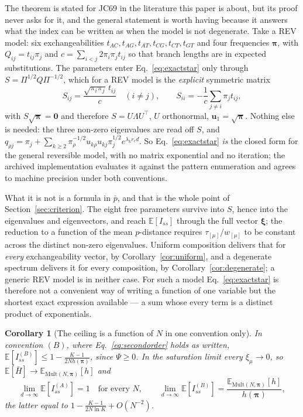 \documentclass[11pt]{article}
\newcommand{\Iss}{I_{ss}}
\newcommand{\Hbar}{\bar H}
\newcommand{\bpi}{\boldsymbol{\pi}}
\newcommand{\bxi}{\boldsymbol{\xi}}
\newcommand{\E}{\mathbb{E}}
\newcommand{\Mult}{\mathrm{Mult}}
\newtheorem{corollary}[theorem]{Corollary}
\theoremstyle{definition}
\theoremstyle{remark}
\begin{document}
The theorem is stated for JC69 in the literature this paper is about, but its
proof never asks for it, and the general statement is worth having because it
answers what the index can be written as when the model is not degenerate.
Take a REV model: six exchangeabilities $t_{AC},t_{AG},t_{AT},t_{CG},t_{CT},
t_{GT}$ and four frequencies $\bpi$, with $Q_{ij}=t_{ij}\pi_j$ and
$c=\sum_{i<j}2\pi_i\pi_jt_{ij}$ so that branch lengths are in expected
substitutions. The parameters enter Eq.~\eqref{eq:exactstar} only through
$S=\Pi^{1/2}Q\Pi^{-1/2}$, which for a REV model is the \emph{explicit}
symmetric matrix
\begin{equation}
  S_{ij}=\frac{\sqrt{\pi_i\pi_j}\,t_{ij}}{c}\quad (i\ne j),\qquad
  S_{ii}=-\frac{1}{c}\sum_{j\ne i}\pi_jt_{ij},
  \label{eq:revS}
\end{equation}
with $S\sqrt{\bpi}=\mathbf 0$ and therefore $S=U\Lambda U^{\!\top}$,
$U$ orthonormal, $\mathbf u_1=\sqrt{\bpi}$. Nothing else is needed: the three
non-zero eigenvalues are read off $S$, and
$q_{\rho j}=\pi_j+\sum_{k\ge2}\pi_\rho^{-1/2}u_{k\rho}u_{kj}\pi_j^{1/2}
e^{\lambda_kr_cd}$. So Eq.~\eqref{eq:exactstar} \emph{is} the closed form for
the general reversible model, with no matrix exponential and no iteration; the
archived implementation evaluates it against the pattern enumeration and
agrees to machine precision under both conventions.

What it is not is a formula in $\bar p$, and that is the whole point of
Section~\ref{sec:criterion}. The eight free parameters survive into
$S$, hence into the eigenvalues and eigenvectors, and reach $\E[\Iss]$ through
the full vector $\bxi$; the reduction to a function of the mean $p$-distance
requires $\tau_{[\mu]}/w_{[\mu]}$ to be constant across the distinct non-zero
eigenvalues. Uniform composition delivers that for \emph{every} exchangeability
vector, by Corollary~\ref{cor:uniform}, and a degenerate spectrum delivers it
for every composition, by Corollary~\ref{cor:degenerate}; a generic REV model
is in neither case. For such a model Eq.~\eqref{eq:exactstar} is therefore not
a convenient way of writing a function of one variable but the shortest exact
expression available --- a sum whose every term is a distinct product of
exponentials.

\begin{corollary}[The ceiling is a function of $N$ in one convention only]
\label{cor:ceiling}
In convention $(B)$, where Eq.~\eqref{eq:secondorder} holds as written,
$\E[\Iss^{(B)}]\le1-\frac{K-1}{2Nh(\bpi)}$, since $\Psi\ge0$. In the
saturation limit every $\xi_\mu\to0$, so
$\E[\Hbar]\to\E_{\Mult(N,\bpi)}[h]$ and
\begin{equation}
  \lim_{d\to\infty}\E[\Iss^{(A)}]=1\quad\text{for every }N,
  \qquad
  \lim_{d\to\infty}\E[\Iss^{(B)}]
  =\frac{\E_{\Mult(N,\bpi)}[h]}{h(\bpi)},
\end{equation}
the latter equal to $1-\frac{K-1}{2N\ln K}+O(N^{-2})$.
\end{corollary}
\end{document}
